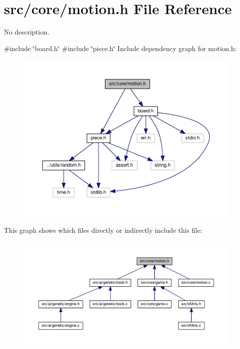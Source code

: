 \section{src/core/motion.h File Reference}
\label{motion_8h}


No description.  


{\ttfamily \#include \char`\"{}board.\+h\char`\"{}}\newline
{\ttfamily \#include \char`\"{}piece.\+h\char`\"{}}\newline
Include dependency graph for motion.\+h\+:
\nopagebreak
\begin{figure}[H]
\begin{center}
\leavevmode
\includegraphics[width=350pt]{motion_8h__incl}
\end{center}
\end{figure}
This graph shows which files directly or indirectly include this file\+:
\nopagebreak
\begin{figure}[H]
\begin{center}
\leavevmode
\includegraphics[width=350pt]{motion_8h__dep__incl}
\end{center}
\end{figure}
